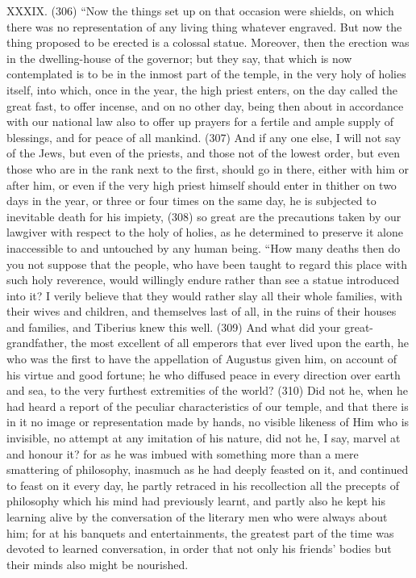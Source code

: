 XXXIX. (306) ``Now the things set up on that occasion were shields, on which there was no
representation of any living thing whatever engraved. But now the thing proposed to be erected is a
colossal statue. Moreover, then the erection was in the dwelling-house of the governor; but they
say, that which is now contemplated is to be in the inmost part of the temple, in the very holy of
holies itself, into which, once in the year, the high priest enters, on the day called the great fast, to
offer incense, and on no other day, being then about in accordance with our national law also to
offer up prayers for a fertile and ample supply of blessings, and for peace of all mankind. (307)
And if any one else, I will not say of the Jews, but even of the priests, and those not of the lowest
order, but even those who are in the rank next to the first, should go in there, either with him or
after him, or even if the very high priest himself should enter in thither on two days in the year, or
three or four times on the same day, he is subjected to inevitable death for his impiety, (308) so
great are the precautions taken by our lawgiver with respect to the holy of holies, as he determined
to preserve it alone inaccessible to and untouched by any human being. ``How many deaths then
do you not suppose that the people, who have been taught to regard this place with such holy
reverence, would willingly endure rather than see a statue introduced into it? I verily believe that
they would rather slay all their whole families, with their wives and children, and themselves last of
all, in the ruins of their houses and families, and Tiberius knew this well. (309) And what did your
great-grandfather, the most excellent of all emperors that ever lived upon the earth, he who was
the first to have the appellation of Augustus given him, on account of his virtue and good fortune;
he who diffused peace in every direction over earth and sea, to the very furthest extremities of the
world? (310) Did not he, when he had heard a report of the peculiar characteristics of our temple,
and that there is in it no image or representation made by hands, no visible likeness of Him who is
invisible, no attempt at any imitation of his nature, did not he, I say, marvel at and honour it? for as
he was imbued with something more than a mere smattering of philosophy, inasmuch as he had
deeply feasted on it, and continued to feast on it every day, he partly retraced in his recollection all
the precepts of philosophy which his mind had previously learnt, and partly also he kept his learning
alive by the conversation of the literary men who were always about him; for at his banquets and
entertainments, the greatest part of the time was devoted to learned conversation, in order that not
only his friends' bodies but their minds also might be nourished.

